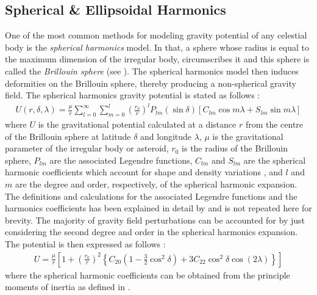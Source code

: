 \subsection{Spherical \& Ellipsoidal Harmonics}
\label{subsec:spherical_ellipsoidal_harmonics}
One of the most common methods for modeling gravity potential of any celestial body is the \textit{spherical harmonics} model. In that, a sphere whose radius is equal to the maximum dimension of the irregular body, circumscribes it and this sphere is called the \textit{Brillouin sphere} (see ). The spherical harmonics model then induces deformities on the Brillouin sphere, thereby producing a non-spherical gravity field. The spherical harmonics gravity potential is stated as follows \parencite{scheeresBook}:
\begin{align}
    U(r, \delta, \lambda) = \frac{\mu}{r} \sum_{l=0}^{\infty} \sum_{m=0}^{l} \left(\frac{r_0}{r}\right)^l P_{lm} (\sin\delta) [C_{lm}\cos m\lambda + S_{lm}\sin m\lambda]
    \label{eqn:spherical_harmonics_general}
\end{align}
where $U$ is the gravitational potential calculated at a distance $r$ from the centre of the Brillouin sphere at latitude $\delta$ and longitude $\lambda$, $\mu$ is the gravitational parameter of the irregular body or asteroid, $r_0$ is the radius of the Brillouin sphere, $P_{lm}$ are the associated Legendre functions, $C_{lm}$ and $S_{lm}$ are the spherical harmonic coefficients which account for shape and density variations \parencite{romain2001ellipsoidal}, and $l$ and $m$ are the degree and order, respectively, of the spherical harmonic expansion. The definitions and calculations for the associated Legendre functions and the harmonics coefficients has been explained in detail by \cite{scheeresBook} and is not repeated here for brevity. The majority of gravity field perturbations can be accounted for by just considering the second degree and order in the spherical harmonics expansion. The potential is then expressed as follows \parencite{scheeresBook}:
\begin{align}
    U = \frac{\mu}{r} \left[ 1 + \left(\frac{r_0}{r}\right)^2 \left\{C_{20} \left(1-\frac{3}{2}\cos^2\delta\right) + 3C_{22}\cos^2\delta \cos(2\lambda) \right\} \right]
    \label{eqn:spherical_harmonics_second_degree}
\end{align}
where the spherical harmonic coefficients can be obtained from the principle moments of inertia as defined in \cite{scheeresBook}.
